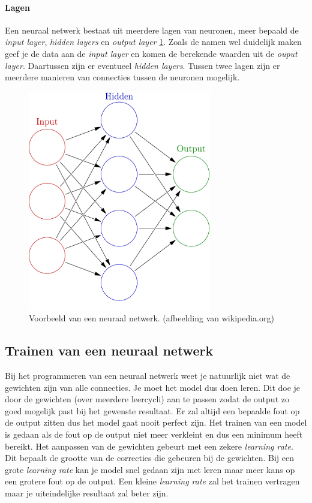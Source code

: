 \documentclass[a4paper,twoside,kulak]{kulakreport}
\begin{document}
\paragraph{Lagen}
Een neuraal netwerk bestaat uit meerdere lagen van neuronen, meer bepaald de \emph{input layer}, \emph{hidden layers} en \emph{output layer} \ref{netwerk}. Zoals de namen wel duidelijk maken geef je de data aan de \emph{input layer} en komen de berekende waarden uit de \emph{ouput layer}. Daartussen zijn er eventueel \emph{hidden layers}. Tussen twee lagen zijn er meerdere manieren van connecties tussen de neuronen mogelijk.

\begin{figure}
	\begin{center}
		\includegraphics[width=8cm]{netwerk.png}
	\end{center}
	\caption{Voorbeeld van een neuraal netwerk. (afbeelding van wikipedia.org)}
	\label{netwerk}
\end{figure}

\subsection{Trainen van een neuraal netwerk}
Bij het programmeren van een neuraal netwerk weet je natuurlijk niet wat de gewichten zijn van alle connecties. Je moet het model dus doen leren. Dit doe je door de gewichten (over meerdere leercycli) aan te passen zodat de output zo goed mogelijk past bij het gewenste resultaat. Er zal altijd een bepaalde fout op de output zitten dus het model gaat nooit perfect zijn. Het trainen van een model is gedaan als de fout op de output niet meer verkleint en dus een minimum heeft bereikt. Het aanpassen van de gewichten gebeurt met een zekere \emph{learning rate}. Dit bepaalt de grootte van de correcties die gebeuren bij de gewichten. Bij een grote \emph{learning rate} kan je model snel gedaan zijn met leren maar meer kans op een grotere fout op de output. Een kleine \emph{learning rate} zal het trainen vertragen maar je uiteindelijke resultaat zal beter zijn.
\end{document}

